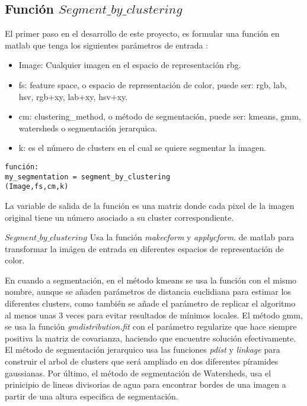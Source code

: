 \documentclass[10pt,twocolumn,letterpaper]{article}
\begin{document}
\subsection{Función $Segment\_by\_clustering$}

El primer paso en el desarrollo de este proyecto, es formular una función en matlab que tenga los siguientes parámetros de entrada :
\begin{itemize}
\item Image: Cualquier imagen en el espacio de representación rbg.
\item fs: feature space, o espacio de representación de color, puede ser: rgb, lab, hsv, rgb+xy, lab+xy, hsv+xy.
\item cm: clustering\_method, o método de segmentación, puede ser: kmeans, gmm, watersheds o segmentación jerarquica.
\item k: es el número de clusters en el cual se quiere segmentar la imagen.
\end{itemize}


\begin{verbatim}
función: 
my_segmentation = segment_by_clustering
(Image,fs,cm,k)

\end{verbatim}

La variable de salida de la función es una matriz donde cada pixel de la imagen original tiene un número asociado a su cluster correspondiente. 

$Segment\_by\_clustering$ Usa la función \textit{makecform} y \textit{applycform}. de matlab para transformar la imágen de entrada en diferentes espacios de representación de color. 

En cuando a segmentación, en el método kmeans se usa la función con el mismo nombre, aunque se añaden parámetros de distancia euclidiana para estimar los diferentes clusters, como también se añade el parámetro de replicar el algoritmo al menos unas 3 veces para evitar resultados de mínimos locales. El método gmm, se usa la función \textit{gmdistribution.fit} con el parámetro regularize que hace siempre positiva la matriz de covarianza, haciendo que encuentre solución efectivamente. El método de segmentación jerarquico usa las funciones \textit{pdist} y \textit{linkage} para construir el arbol de clusters que será ampliado en dos diferentes píramides gaussianas. Por último, el método de segmentación de Watersheds, usa el prinicipio de lineas divisorias de agua para encontrar bordes de una imagen a partir de una altura especifica de segmentación. 
\end{document}
